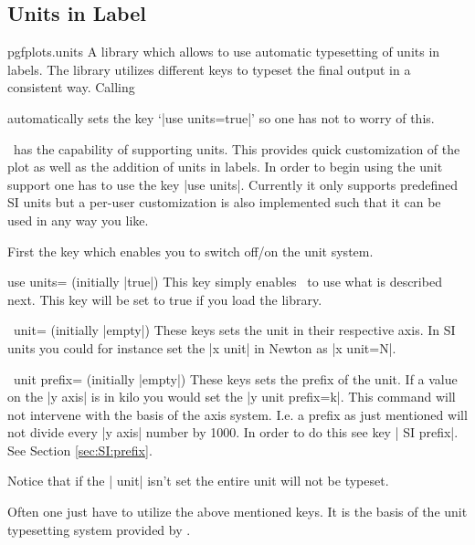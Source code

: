 \subsection{Units in Label}
\label{sec:units}
\begin{tikzlibrary}{pgfplots.units}
	A library which allows to use automatic typesetting of units in labels. The library utilizes different keys to typeset the final output in a consistent way.
	Calling
\begin{codeexample}
	\usetikzlibrary{pgfplots.units}
\end{codeexample}
	automatically sets the key `|use units=true|' so one has not to worry of this.
\end{tikzlibrary}
 \PGFPlots\ has the capability of supporting units. This provides quick customization of the plot as well as the addition of units in labels. In order to
 begin using the unit support one has to use the key |use units|. Currently it only supports predefined SI units but a per-user customization is also
 implemented such that it can be used in any way you like.

 First the key which enables you to switch off/on the unit system.
\begin{pgfplotskey}{use units= (initially |true|)}
  This key simply enables \PGFPlots\ to use what is described next. This key will be set to true if you load the library.
\end{pgfplotskey}
\begin{pgfplotsxykey}{\x\ unit= (initially |empty|)}
  These keys sets the unit in their respective axis. In SI units you could for instance set the |x unit| in Newton as |x unit=N|.
\end{pgfplotsxykey}
\begin{pgfplotsxykey}{\x\ unit prefix= (initially |empty|)}
  These keys sets the prefix of the unit. If a value on the |y axis| is in kilo you would set the |y unit prefix=k|. This command will not intervene with
  the basis of the axis system. I.e. a prefix as just mentioned will not divide every |y axis| number by 1000. In order to do this see key | SI prefix|. See Section \ref{sec:SI:prefix}.
  
  Notice that if the | unit| isn't set the entire unit will not be typeset.
\end{pgfplotsxykey}
Often one just have to utilize the above mentioned keys. It is the basis of the unit typesetting system provided by \PGFPlots. 
\begin{codeexample}[]
\end{codeexample}


